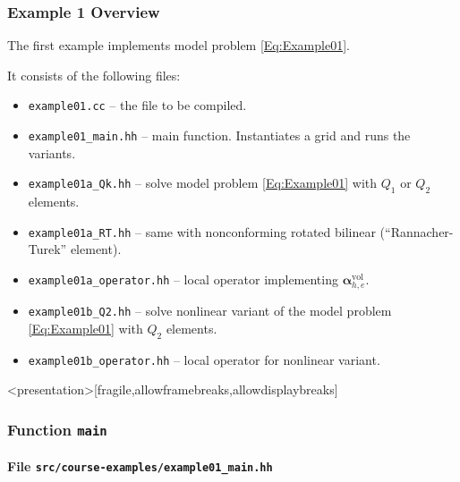 \begin{frame}
\frametitle{Example 1 Overview}
The first example implements model problem \eqref{Eq:Example01}.

It consists of the following files:
\begin{itemize}
\item \lstinline{example01.cc} -- the file to be compiled.
\item \lstinline{example01_main.hh} -- main function. Instantiates a grid and runs the variants.
\item \lstinline{example01a_Qk.hh} -- solve model problem \eqref{Eq:Example01} with $Q_1$ or $Q_2$ elements.
\item \lstinline{example01a_RT.hh} -- same with nonconforming rotated bilinear (``Rannacher-Turek'' element).
\item \lstinline{example01a_operator.hh} -- local operator implementing $\bm{\alpha}_{h,e}^{\text{vol}}$.
\item \lstinline{example01b_Q2.hh} -- solve nonlinear variant of the model problem \eqref{Eq:Example01} with $Q_2$ elements.
\item \lstinline{example01b_operator.hh} -- local operator for nonlinear variant.
\end{itemize}
\end{frame}

\begin{frame}<presentation>[fragile,allowframebreaks,allowdisplaybreaks]
\frametitle<presentation>{Function \lstinline{main}}
\framesubtitle<presentation>{File \texttt{src/course-examples/example01\_main.hh}}

\end{frame}



